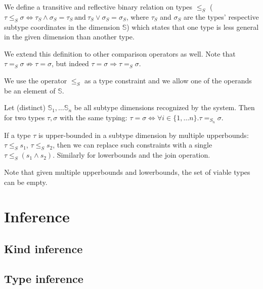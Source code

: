 \begin{defn}
    We define a transitive and reflective binary relation on types $\leq_S$ ($\tau \leq_S \sigma \iff \tau_S \wedge \sigma_S = \tau_S\ \mathrm{and}\ \tau_S \vee \sigma_S = \sigma_S$, where $\tau_S$ and $\sigma_S$ are the types' respective subtype coordinates in the dimension $\mathbb{S}$) which states that one type is less general in the given dimension than another type.

    We extend this definition to other comparison operators as well. Note that $\tau =_S \sigma \not\Rightarrow \tau = \sigma$, but indeed $\tau = \sigma \Rightarrow \tau =_S \sigma$.

    We use the operator $\leq_S$ as a type constraint and we allow one of the operands be an element of $\mathbb{S}$.
\end{defn}

\begin{lemma}
    Let (distinct) $\mathbb{S}_1, \dots \mathbb{S}_n$ be all subtype dimensions recognized by the system. Then for two types $\tau, \sigma$ with the same typing: $\tau = \sigma \iff \forall i \in \{1, \dots n\} . \tau =_{S_n} \sigma$. 
\end{lemma}

\begin{lemma}
    If a type $\tau$ is upper-bounded in a subtype dimension by multiple upperbounds: $\tau \leq_S s_1$, $\tau \leq_S s_2$, then we can replace such constraints with a single $\tau \leq_S (s_1 \wedge s_2)$. Similarly for lowerbounds and the join operation.

    Note that given multiple upperbounds and lowerbounds, the set of viable types can be empty. 
\end{lemma}

\section{Inference}

\subsection{Kind inference}


\subsection{Type inference}

